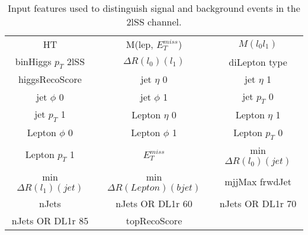 \begin{table}[H]
  \begin{center}
  \begin{tabular}{ccc}
    \hline\hline
    HT & M(lep, $E_T^{miss}$) & $M(l_0l_1)$ \\
    binHiggs $p_T$ 2lSS & $\Delta R(l_0)(l_1)$ & diLepton type \\
    higgsRecoScore & jet  $\eta$ 0 & jet  $\eta$ 1 \\
    jet $\phi$ 0 & jet $\phi$ 1 & jet  $p_T$ 0 \\
    jet  $p_T$ 1 & Lepton  $\eta$ 0 & Lepton  $\eta$ 1 \\
    Lepton $\phi$ 0 & Lepton $\phi$ 1 & Lepton  $p_T$ 0 \\
    Lepton  $p_T$ 1 & $E_T^{miss}$ & min $\Delta R(l_0)(jet)$ \\
    min $\Delta R(l_1)(jet)$ & min $\Delta R(Lepton)(bjet)$ & mjjMax frwdJet \\
    nJets & nJets OR DL1r 60 & nJets OR DL1r 70 \\
    nJets OR DL1r 85 & topRecoScore &\\
    \hline
  \end{tabular}
  \end{center}
  \caption{Input features used to distinguish signal and background events in the 2lSS channel.}
  \label{tab:sigBkg2lSSfeatures}
\end{table}
